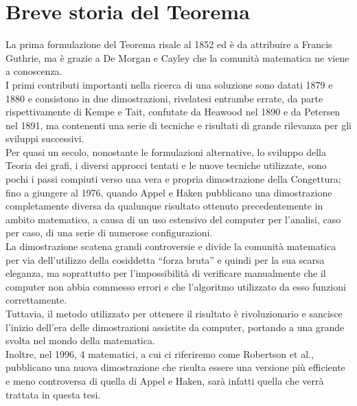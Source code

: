 \documentclass[a4paper,12pt,titlepage]{report}
\begin{document}
	\section{Breve storia del Teorema}
	La prima formulazione del Teorema risale al 1852 ed è da attribuire a Francis Guthrie, ma è grazie a De Morgan e Cayley che la comunità matematica ne viene a conoscenza. 
	\\I primi contributi importanti nella ricerca di una soluzione sono datati 1879 e 1880 e consistono in due dimostrazioni, rivelatesi entrambe errate, da parte rispettivamente di Kempe e Tait, confutate da Heawood nel 1890 e da Petersen nel 1891, ma contenenti una serie di tecniche e risultati di grande rilevanza per gli sviluppi successivi.
	\\Per quasi un secolo, nonostante le formulazioni alternative, lo sviluppo della Teoria dei grafi, i diversi approcci tentati e le nuove tecniche utilizzate, sono pochi i passi compiuti verso una vera e propria dimostrazione della Congettura; fino a giungere al 1976, quando Appel e Haken pubblicano una dimostrazione completamente diversa da qualunque risultato ottenuto precedentemente in ambito matematico, a causa di un uso estensivo del computer per l’analisi, caso per caso, di una serie di numerose configurazioni.
	\\La dimostrazione scatena grandi controversie e divide la comunità matematica per via dell’utilizzo della cosiddetta “forza bruta” e quindi per la sua scarsa eleganza, ma soprattutto per l’impossibilità di verificare manualmente che il computer non abbia commesso errori e che l’algoritmo utilizzato da esso funzioni correttamente.
	\\Tuttavia, il metodo utilizzato per ottenere il risultato è rivoluzionario e sancisce l’inizio dell’era delle dimostrazioni assistite da computer, portando a una grande svolta nel mondo della matematica.
	\\Inoltre, nel 1996, 4 matematici, a cui ci riferiremo come Robertson et al., pubblicano una nuova dimostrazione che risulta essere una versione più efficiente e meno controversa di quella di Appel e Haken, sarà infatti quella che verrà trattata in questa tesi.
	
\end{document}
